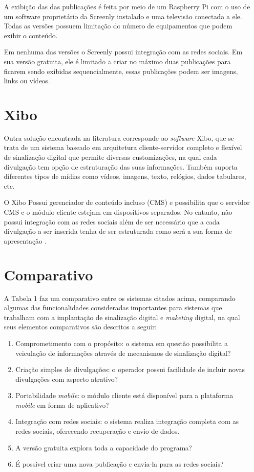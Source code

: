 A exibição das das publicações é feita por meio de um Raspberry Pi com o uso de um software proprietário da Screenly instalado e uma televisão conectada a ele. Todas as versões possuem limitação do número de equipamentos que podem exibir o conteúdo.

Em nenhuma das versões o Screenly possui integração com as redes sociais. Em sua versão gratuita, ele é limitado a criar no máximo duas publicações para ficarem sendo exibidas sequencialmente, essas publicações podem ser imagens, links ou vídeos.

\section{Xibo}
Outra solução encontrada na literatura corresponde ao \textit{software} Xibo, que se trata de um sistema baseado em arquitetura cliente-servidor completo e flexível de sinalização digital que permite diversas customizações, na qual cada divulgação tem opção de estruturação das suas informações. Também suporta diferentes tipos de mídias como vídeos, imagens, texto, relógios, dados tabulares, etc. 

O Xibo Possui gerenciador de conteúdo incluso (CMS) e possibilita que o servidor CMS e o módulo cliente estejam em dispositivos separados. No entanto, não possui integração com as redes sociais além de ser necessário que a cada divulgação a ser inserida tenha de ser estruturada como será a sua forma de apresentação \cite{xibo2017}.

\section{Comparativo}
A Tabela 1 faz um comparativo entre os sistemas citados acima, comparando algumas das funcionalidades consideradas importantes para sistemas que trabalham com a implantação de sinalização digital e \textit{maketing} digital, na qual seus elementos comparativos são descritos a seguir:
\begin{enumerate}[label=\Roman*)]
	\item Comprometimento com o propósito: o sistema em questão possibilita a veiculação de informações através de mecanismos de sinalização digital?
	\item Criação simples de divulgações: o operador possui facilidade de incluir novas divulgações com aspecto atrativo?
	\item Portabilidade \textit{mobile}: o módulo cliente está disponível para a plataforma \textit{mobile} em forma de aplicativo?
	\item Integração com redes sociais: o sistema realiza integração completa com as redes sociais, oferecendo recuperação e envio de dados.
	\item A versão gratuita explora toda a capacidade do programa?
	\item É possível criar uma nova publicação e envia-la para as redes sociais?
\end{enumerate}


